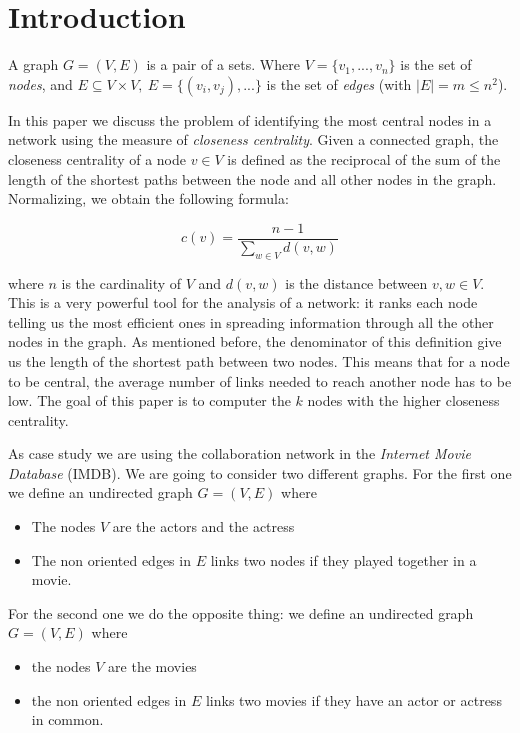 \section{Introduction}
A graph $G= (V,E)$ is a pair of a sets. Where $V = \{v_1,...,v_n\}$ is the set of \emph{nodes}, and $E \subseteq V \times V, ~ E = \{(v_i,v_j),...\}$  is the set of \emph{edges} (with $|E| = m \leq n^2$). \s

\nd In this paper we discuss the problem of identifying the most central nodes in a network using the measure of \emph{closeness centrality}. Given a connected graph, the closeness centrality of a node $v \in V$ is defined \cite{Sodeur2019} as the reciprocal of the sum of the length of the shortest paths between the node and all other nodes in the graph. Normalizing, we obtain the following formula:

\begin{equation}\label{closeness}
   c(v) = \frac{n-1}{\displaystyle \sum_{w \in V} d(v,w)}
\end{equation}

\nd where $n$ is the cardinality of $V$ and $d(v,w)$ is the distance between $v,w \in V$. This is a very powerful tool for the analysis of a network: it ranks each node telling us the most efficient ones in spreading information through all the other nodes in the graph. As mentioned before, the denominator of this definition give us the length of the shortest path between two nodes. This means that for a node to be central, the average number of links needed to reach another node has to be low. The goal of this paper is to computer the $k$ nodes with the higher closeness centrality. \s

\noindent As case study we are using the collaboration network in the \emph{Internet Movie Database} (IMDB).  We are going to consider two different graphs. For the first one we define an undirected graph $G=(V,E)$ where
\begin{itemize}
    \item The nodes $V$ are the actors and the actress
    \item The non oriented edges in $E$ links two nodes if they played together in a movie.
\end{itemize}
For the second one we do the opposite thing: we define an undirected graph $G=(V,E)$ where
\begin{itemize}
    \item the nodes $V$ are the movies
    \item the non oriented edges in $E$ links two movies if they have an actor or actress in common.
\end{itemize}

